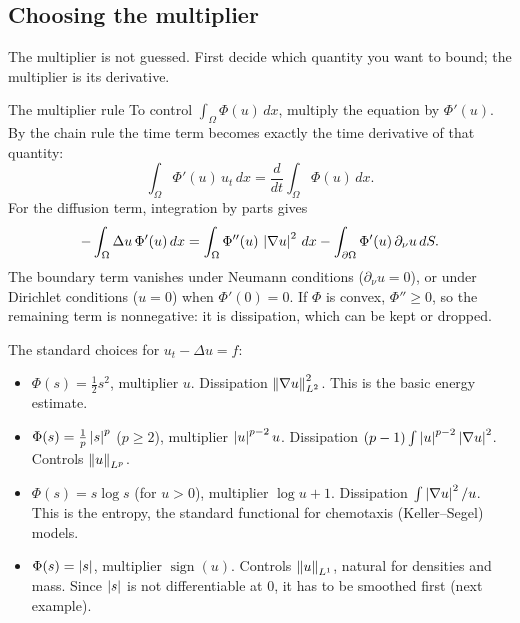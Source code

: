 \subsection*{Choosing the multiplier}

The multiplier is not guessed. First decide which quantity you want to bound; the multiplier is its derivative.

\begin{thmbox}{The multiplier rule}
%
To control $\int_\Omega \Phi(u)\,dx$, multiply the equation by $\Phi'(u)$. By the chain rule the time term becomes exactly the time derivative of that quantity:
\[
\int_\Omega \Phi'(u)\,u_t\,dx=\frac{d}{dt}\int_\Omega \Phi(u)\,dx.
\]
For the diffusion term, integration by parts gives
\[
-\int_\Omega \Delta u\,\Phi'(u)\,dx=\int_\Omega \Phi''(u)\,\left\lvert \nabla u\right\rvert^2\,dx-\int_{\partial\Omega}\Phi'(u)\,\partial_\nu u\,dS .
\]
The boundary term vanishes under Neumann conditions ($\partial_\nu u=0$), or under Dirichlet conditions ($u=0$) when $\Phi'(0)=0$. If $\Phi$ is convex, $\Phi''\ge 0$, so the remaining term is nonnegative: it is dissipation, which can be kept or dropped.
\end{thmbox}

The standard choices for $u_t-\Delta u=f$:
\begin{itemize}
\item $\Phi(s)=\frac12 s^2$, multiplier $u$. Dissipation $\left\lVert \nabla u\right\rVert_{L^2}^2$. This is the basic energy estimate.
\item $\Phi(s)=\frac1p\left\lvert s\right\rvert^p$ ($p\ge 2$), multiplier $\left\lvert u\right\rvert^{p-2}u$. Dissipation $(p-1)\int\left\lvert u\right\rvert^{p-2}\left\lvert \nabla u\right\rvert^2$. Controls $\left\lVert u\right\rVert_{L^p}$.
\item $\Phi(s)=s\log s$ (for $u>0$), multiplier $\log u+1$. Dissipation $\int \left\lvert \nabla u\right\rvert^2/u$. This is the entropy, the standard functional for chemotaxis (Keller--Segel) models.
\item $\Phi(s)=\left\lvert s\right\rvert$, multiplier $\operatorname{sign}(u)$. Controls $\left\lVert u\right\rVert_{L^1}$, natural for densities and mass. Since $\left\lvert s\right\rvert$ is not differentiable at $0$, it has to be smoothed first (next example).
\end{itemize}

